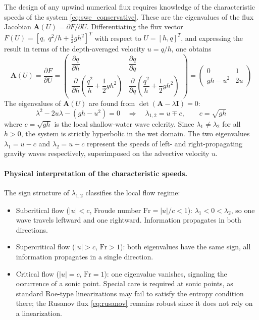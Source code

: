 The design of any upwind numerical flux requires knowledge of the characteristic 
speeds of the system \eqref{eq:swe_conservative}. These are the eigenvalues of 
the flux Jacobian $\mathbf{A}(U) = \partial F / \partial U$. 
Differentiating the flux vector $F(U) = [q,\; q^2/h + \tfrac{1}{2}gh^2]^T$ 
with respect to $U = [h, q]^T$, and expressing the result in terms of the 
depth-averaged velocity $u = q/h$, one obtains
%
\begin{equation}
    \mathbf{A}(U) 
    = \frac{\partial F}{\partial U}
    = \begin{pmatrix}
        \dfrac{\partial q}{\partial h} & \dfrac{\partial q}{\partial q} \\[10pt]
        \dfrac{\partial}{\partial h}\!\left(\dfrac{q^2}{h} + \dfrac{1}{2}gh^2\right) &
        \dfrac{\partial}{\partial q}\!\left(\dfrac{q^2}{h} + \dfrac{1}{2}gh^2\right)
    \end{pmatrix}
    =
    \begin{pmatrix}
        0 & 1 \\
        gh - u^2 & 2u
    \end{pmatrix}
    \label{eq:jacobian}
\end{equation}
%
The eigenvalues of $\mathbf{A}(U)$ are found from 
$\det(\mathbf{A} - \lambda \mathbf{I}) = 0$:
%
\begin{equation}
    \lambda^2 - 2u\lambda - (gh - u^2) = 0
    \quad\Longrightarrow\quad
    \lambda_{1,2} = u \mp c, 
    \qquad c = \sqrt{gh}
    \label{eq:eigenvalues}
\end{equation}
%
where $c = \sqrt{gh}$ is the local shallow-water wave celerity. Since 
$\lambda_1 \neq \lambda_2$ for all $h > 0$, the system is strictly 
hyperbolic in the wet domain. The two eigenvalues $\lambda_1 = u - c$ and 
$\lambda_2 = u + c$ represent the speeds of left- and right-propagating 
gravity waves respectively, superimposed on the advective velocity $u$.

\paragraph{Physical interpretation of the characteristic speeds.}
The sign structure of $\lambda_{1,2}$ classifies the local flow regime:
\begin{itemize}
    \item Subcritical flow ($|u| < c$, Froude number $\mathrm{Fr} = |u|/c < 1$): 
    $\lambda_1 < 0 < \lambda_2$, so one wave travels leftward and one rightward. 
    Information propagates in both directions.
    \item Supercritical flow ($|u| > c$, $\mathrm{Fr} > 1$): both eigenvalues 
    have the same sign, all information propagates in a single direction.
    \item Critical flow ($|u| = c$, $\mathrm{Fr} = 1$): one eigenvalue 
    vanishes, signaling the occurrence of a sonic point. Special care is 
    required at sonic points, as standard Roe-type linearizations may fail to 
    satisfy the entropy condition there; the Rusanov flux \eqref{eq:rusanov} 
    remains robust since it does not rely on a linearization.
\end{itemize}

